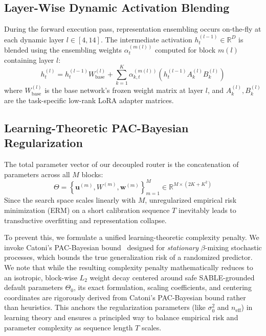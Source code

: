 \subsection{Layer-Wise Dynamic Activation Blending}
During the forward execution pass, representation ensembling occurs on-the-fly at each dynamic layer $l \in [4, 14]$. The intermediate activation $h_t^{(l-1)} \in \mathbb{R}^D$ is blended using the ensembling weights $\alpha^{(m(l))}_t$ computed for block $m(l)$ containing layer $l$:
\begin{equation}
    h_t^{(l)} = h_t^{(l-1)} W_{\text{base}}^{(l)} + \sum_{k=1}^K \alpha^{(m(l))}_{k, t} \left( h_t^{(l-1)} A_k^{(l)} B_k^{(l)} \right)
\end{equation}
where $W_{\text{base}}^{(l)}$ is the base network's frozen weight matrix at layer $l$, and $A_k^{(l)}, B_k^{(l)}$ are the task-specific low-rank LoRA adapter matrices.

\subsection{Learning-Theoretic PAC-Bayesian Regularization}
The total parameter vector of our decoupled router is the concatenation of parameters across all $M$ blocks:
\begin{equation}
    \Theta = \left\{ \mathbf{u}^{(m)}, W^{(m)}, \mathbf{w}^{(m)} \right\}_{m=1}^M \in \mathbb{R}^{M \times (2K + K^2)}
\end{equation}
Since the search space scales linearly with $M$, unregularized empirical risk minimization (ERM) on a short calibration sequence $T$ inevitably leads to transductive overfitting and representation collapse. 

To prevent this, we formulate a unified learning-theoretic complexity penalty. We invoke Catoni’s PAC-Bayesian bound~\cite{catoni2007} designed for \emph{stationary} $\beta$-mixing stochastic processes, which bounds the true generalization risk of a randomized predictor. We note that while the resulting complexity penalty mathematically reduces to an isotropic, block-wise $L_2$ weight decay centered around safe SABLE-grounded default parameters $\Theta_0$, its exact formulation, scaling coefficients, and centering coordinates are rigorously derived from Catoni's PAC-Bayesian bound rather than heuristics. This anchors the regularization parameters (like $\sigma_0^2$ and $n_{\text{eff}}$) in learning theory and ensures a principled way to balance empirical risk and parameter complexity as sequence length $T$ scales. 

